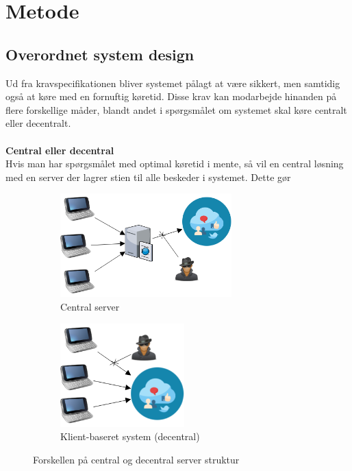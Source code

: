 \section{Metode}
\subsection{Overordnet system design}
Ud fra kravspecifikationen bliver systemet pålagt at være sikkert, men samtidig også at køre med en fornuftig køretid. Disse krav kan  modarbejde hinanden på flere forskellige måder, blandt andet i spørgsmålet om systemet skal køre centralt eller decentralt.
\\\\
\textbf{Central eller decentral}\\
Hvis man har spørgsmålet med optimal køretid i mente, så vil en central løsning med en server der lagrer stien til alle beskeder i systemet. Dette gør 


\begin{figure}[H]
    \begin{subfigure}{0.5\textwidth}
        \centering
        \includegraphics[width=1\linewidth, height=4cm]{Projectdoc/Assets/Illustrationer/Security_diagram_1.png} 
        \caption{Central server}
        \label{fig:central_server}
    \end{subfigure}
    \begin{subfigure}{0.5\textwidth}
        \centering
        \includegraphics[width=0.7\linewidth, height=4cm]{Projectdoc/Assets/Illustrationer/Security_diagram_2.png}
        \caption{Klient-baseret system (decentral)}
        \label{fig:decentral_server}
    \end{subfigure}
    \caption{Forskellen på central og decentral server struktur}
    \label{fig:serverstruktur}
\end{figure}

